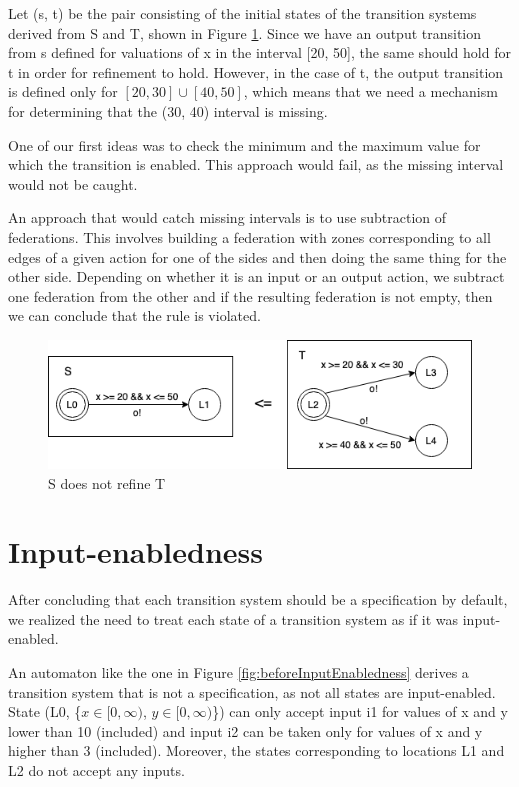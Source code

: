 Let (s, t) be the pair consisting of the initial states of the transition systems derived from S and T, shown in Figure \ref{fig:missingIntervals}. Since we have an output transition from s defined for valuations of x in the interval [20, 50], the same should hold for t in order for refinement to hold. However, in the case of t, the output transition is defined only for $[20, 30] \cup [40, 50]$, which means that we need a mechanism for determining that the (30, 40) interval is missing. 

One of our first ideas was to check the minimum and the maximum value for which the transition is enabled. This approach would fail, as the missing interval would not be caught.

An approach that would catch missing intervals is to use subtraction of federations. This involves building a federation with zones corresponding to all edges of a given action for one of the sides and then doing the same thing for the other side. Depending on whether it is an input or an output action, we subtract one federation from the other and if the resulting federation is not empty, then we can conclude that the rule is violated.

\begin{figure}
  \centering
  \includegraphics[scale=0.7]{figures/missingIntervals.png}
  \caption{S does not refine T}
  \label{fig:missingIntervals}
\end{figure}

\section{Input-enabledness}

After concluding that each transition system should be a specification by default, we realized the need to treat each state of a transition system as if it was input-enabled.

An automaton like the one in Figure \ref{fig:beforeInputEnabledness} derives a transition system that is not a specification, as not all states are input-enabled. State (L0, \{$x \in [0, \infty)$, $y \in [0, \infty)$\}) can only accept input i1 for values of x and y lower than 10 (included) and input i2 can be taken only for values of x and y higher than 3 (included). Moreover, the states corresponding to locations L1 and L2 do not accept any inputs.

